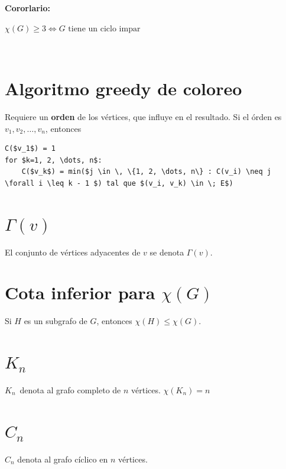 \documentclass[10pt,a4paper]{article}
\begin{document}
\textbf{Cororlario:}

$\chi(G) \geq 3 \Leftrightarrow G \text{ tiene un ciclo impar }$

 

\section*{Algoritmo greedy de coloreo}

Requiere un \textbf{orden} de los vértices, que influye en el resultado. Si el órden es $v_1, v_2, \dots, v_n$, entonces


    \begin{lstlisting}[language=pseudo]
C($v_1$) = 1
for $k=1, 2, \dots, n$:
    C($v_k$) = min($j \in \, \{1, 2, \dots, n\} : C(v_i) \neq j \forall i \leq k - 1 $) tal que $(v_i, v_k) \in \; E$)
\end{lstlisting}


\section*{$\Gamma(v)$}

El conjunto de vértices adyacentes de $v$ se denota $\Gamma(v)$.

\section*{Cota inferior para $\chi(G)$}

Si $H$ es un subgrafo de $G$, entonces $\chi(H)\leq \chi(G)$.

\section*{$K_n$}

$K_n$ denota al grafo completo de $n $ vértices. $\chi(K_n) = n$

\section*{$C_n$}

$C_n$ denota al grafo cíclico en $n$ vértices.
\end{document}
